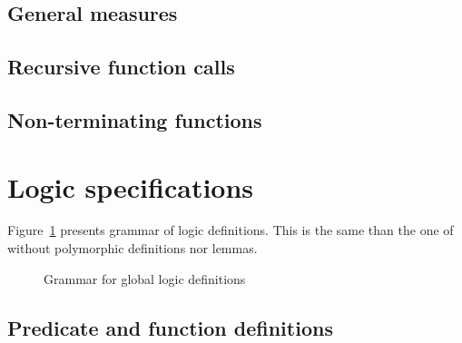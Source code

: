 
\subsection{General measures}
\absent


\subsection{Recursive function calls}
\nodiff


\subsection{Non-terminating functions}
\absent


\section{Logic specifications}
\label{sec:logicspec}


Figure~\ref{fig:gram:logic} presents grammar of logic definitions. This is the
same than the one of \acsl without polymorphic definitions nor lemmas.

\begin{figure}[htbp]
  \caption{Grammar for global logic definitions}
\label{fig:gram:logic}
\end{figure}


\subsection{Predicate and function definitions}
\nodiff

